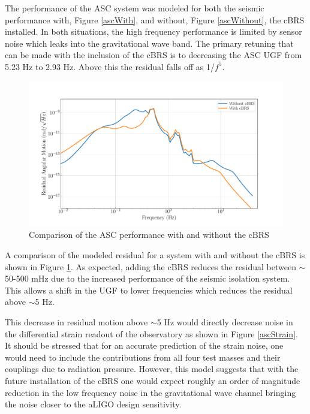 \documentclass [12pt, proquest]{uwthesis}[2019]
\begin{document}
The performance of the ASC system was modeled for both the seismic performance with, Figure \ref{ascWith}, and without, Figure \ref{ascWithout}, the cBRS installed. In both situations, the high frequency performance is limited by sensor noise which leaks into the gravitational wave band. The primary retuning that can be made with the inclusion of the cBRS is to decreasing the ASC UGF from 5.23 Hz to 2.93 Hz. Above this the residual falls off as 1/$f^5$.

\begin{figure}[!h]
\begin{center}
\includegraphics[width=\textwidth]{cBRS_ASC_LowF.pdf}
\caption[Comparison of the ASC performance with and without the cBRS]{Comparison of the ASC performance with and without the cBRS}
\label{ascComp}
\end{center}
\end{figure}

A comparison of the modeled residual for a system with and without the cBRS is shown in Figure \ref{ascComp}. As expected, adding the cBRS reduces the residual between $\sim$50-500 mHz due to the increased performance of the seismic isolation system. This allows a shift in the UGF to lower frequencies which reduces the residual above $\sim$5 Hz. 

This decrease in residual motion above $\sim$5 Hz would directly decrease noise in the differential strain readout of the observatory as shown in Figure \ref{ascStrain}. It should be stressed that for an accurate prediction of the strain noise, one would need to include the contributions from all four test masses and their couplings due to radiation pressure. However, this model suggests that with the future installation of the cBRS one would expect roughly an order of magnitude reduction in the low frequency noise in the gravitational wave channel bringing the noise closer to the aLIGO design sensitivity.
\end{document}
